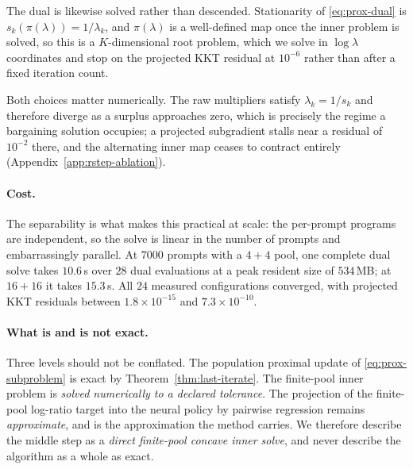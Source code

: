 The dual is likewise solved rather than descended. Stationarity of
\eqref{eq:prox-dual} is $s_k(\pi(\lambda))=1/\lambda_k$, and $\pi(\lambda)$ is
a well-defined map once the inner problem is solved, so this is a $K$-dimensional
root problem, which we solve in $\log\lambda$ coordinates and stop on the
projected KKT residual at $10^{-6}$ rather than after a fixed iteration count.

Both choices matter numerically. The raw multipliers satisfy $\lambda_k=1/s_k$
and therefore diverge as a surplus approaches zero, which is precisely the regime
a bargaining solution occupies; a projected subgradient stalls near a residual of
$10^{-2}$ there, and the alternating inner map ceases to contract entirely
(Appendix~\ref{app:rstep-ablation}).

\paragraph{Cost.} The separability is what makes this practical at scale: the
per-prompt programs are independent, so the solve is linear in the number of
prompts and embarrassingly parallel. At $7000$ prompts with a $4{+}4$ pool, one
complete dual solve takes $10.6$\,s over $28$ dual evaluations at a peak resident
size of $534$\,MB; at $16{+}16$ it takes $15.3$\,s. All $24$ measured
configurations converged, with projected KKT residuals between $1.8\times10^{-15}$
and $7.3\times10^{-10}$.

\paragraph{What is and is not exact.} Three levels should not be conflated. The
population proximal update of \eqref{eq:prox-subproblem} is exact by
Theorem~\ref{thm:last-iterate}. The finite-pool inner problem is \emph{solved
numerically to a declared tolerance}. The projection of the finite-pool
log-ratio target into the neural policy by pairwise regression remains
\emph{approximate}, and is the approximation the method carries. We therefore
describe the middle step as a \emph{direct finite-pool concave inner solve}, and
never describe the algorithm as a whole as exact.


